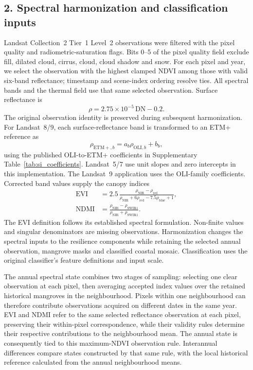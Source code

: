 \subsection{2. Spectral harmonization and classification inputs}

Landsat Collection~2 Tier~1 Level~2 observations\cite{Landsat45C2L2,Landsat7C2L2,Landsat89C2L2} were filtered with the pixel quality and radiometric-saturation flags. Bits 0--5 of the pixel quality field exclude fill, dilated cloud, cirrus, cloud, cloud shadow and snow. For each pixel and year, we select the observation with the highest clamped NDVI among those with valid six-band reflectance; timestamp and scene-index ordering resolve ties. All spectral bands and the thermal field use that same selected observation. Surface reflectance is
\begin{equation}\label{eq:si_reflectance}
\rho=2.75\times10^{-5}\,\mathrm{DN}-0.2.
\end{equation}
The original observation identity is preserved during subsequent harmonization. For Landsat~8/9, each surface-reflectance band is transformed to an ETM+ reference as
\begin{equation}\label{eq:si_harmonization}
\rho_{\mathrm{ETM+},b}=a_b\rho_{\mathrm{OLI},b}+b_b,
\end{equation}
using the published OLI-to-ETM+ coefficients\cite{Roy2016} in Supplementary Table~\ref{tab:si_coefficients}. Landsat~5/7 use unit slopes and zero intercepts in this implementation. The Landsat~9 application uses the OLI-family coefficients\cite{Gross2023}. Corrected band values supply the canopy indices
\begin{align}
\mathrm{EVI}&=2.5\,\frac{\rho_{\mathrm{NIR}}-\rho_{\mathrm{red}}}
 {\rho_{\mathrm{NIR}}+6\rho_{\mathrm{red}}-7.5\rho_{\mathrm{blue}}+1},\label{eq:si_evi}\\
\mathrm{NDMI}&=\frac{\rho_{\mathrm{NIR}}-\rho_{\mathrm{SWIR1}}}
 {\rho_{\mathrm{NIR}}+\rho_{\mathrm{SWIR1}}}.\label{eq:si_ndmi}
\end{align}
The EVI definition follows its established spectral formulation\cite{Huete2002}. Non-finite values and singular denominators are missing observations. Harmonization changes the spectral inputs to the resilience components while retaining the selected annual observation, mangrove masks and classified coastal mosaic. Classification uses the original classifier's feature definitions and input scale.

The annual spectral state combines two stages of sampling: selecting one clear observation at each pixel, then averaging accepted index values over the retained historical mangroves in the neighbourhood. Pixels within one neighbourhood can therefore contribute observations acquired on different dates in the same year. EVI and NDMI refer to the same selected reflectance observation at each pixel, preserving their within-pixel correspondence, while their validity rules determine their respective contributions to the neighbourhood mean. The annual state is consequently tied to this maximum-NDVI observation rule. Interannual differences compare states constructed by that same rule, with the local historical reference calculated from the annual neighbourhood means.

